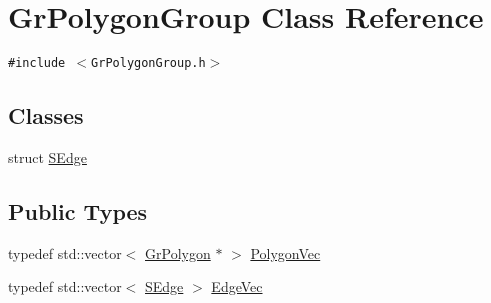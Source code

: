 \hypertarget{class_gr_polygon_group}{
\section{GrPolygonGroup Class Reference}
\label{class_gr_polygon_group}
}
{\tt \#include $<$GrPolygonGroup.h$>$}

\subsection*{Classes}
\begin{CompactItemize}
\item 
struct \hyperlink{struct_gr_polygon_group_1_1_s_edge}{SEdge}
\end{CompactItemize}
\subsection*{Public Types}
\begin{CompactItemize}
\item 
typedef std::vector$<$ \hyperlink{class_gr_polygon}{GrPolygon} $\ast$ $>$ \hyperlink{class_gr_polygon_group_af5dedb77a4dc642d9fcca85710c3cf5}{PolygonVec}
\item 
typedef std::vector$<$ \hyperlink{struct_gr_polygon_group_1_1_s_edge}{SEdge} $>$ \hyperlink{class_gr_polygon_group_8b3e2128f854d70f9d500ae00dafe5bd}{EdgeVec}
\end{CompactItemize}
